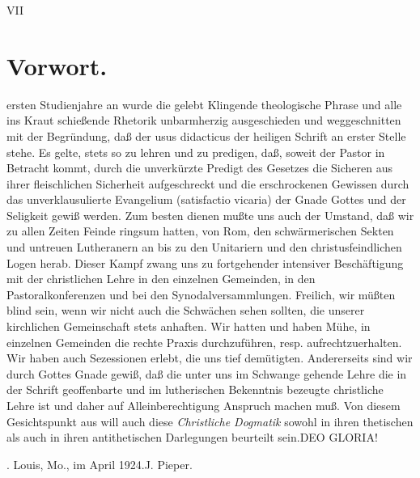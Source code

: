 \hfill VII\n\n\section*{Vorwort.}\nIm ersten Studienjahre an wurde die gelebt Klingende theologische Phrase und alle ins Kraut schießende Rhetorik unbarmherzig ausgeschieden und weggeschnitten mit der Begründung, daß der usus didacticus der heiligen Schrift an erster Stelle stehe. Es gelte, stets so zu lehren und zu predigen, daß, soweit der Pastor in Betracht kommt, durch die unverkürzte Predigt des Gesetzes die Sicheren aus ihrer fleischlichen Sicherheit aufgeschreckt und die erschrockenen Gewissen durch das unverklausulierte Evangelium (satisfactio vicaria) der Gnade Gottes und der Seligkeit gewiß werden. Zum besten dienen mußte uns auch der Umstand, daß wir zu allen Zeiten Feinde ringsum hatten, von Rom, den schwärmerischen Sekten und untreuen Lutheranern an bis zu den Unitariern und den christusfeindlichen Logen herab. Dieser Kampf zwang uns zu fortgehender intensiver Beschäftigung mit der christlichen Lehre in den einzelnen Gemeinden, in den Pastoralkonferenzen und bei den Synodalversammlungen. Freilich, wir müßten blind sein, wenn wir nicht auch die Schwächen sehen sollten, die unserer kirchlichen Gemeinschaft stets anhaften. Wir hatten und haben Mühe, in einzelnen Gemeinden die rechte Praxis durchzuführen, resp. aufrechtzuerhalten. Wir haben auch Sezessionen erlebt, die uns tief demütigten. Andererseits sind wir durch Gottes Gnade gewiß, daß die unter uns im Schwange gehende Lehre die in der Schrift geoffenbarte und im lutherischen Bekenntnis bezeugte christliche Lehre ist und daher auf Alleinberechtigung Anspruch machen muß. Von diesem Gesichtspunkt aus will auch diese \emph{Christliche Dogmatik} sowohl in ihren thetischen als auch in ihren antithetischen Darlegungen beurteilt sein.\n\n\vspace{1em}\n\centering\nSOLI DEO GLORIA!\n\par\n\n\vspace{1em}\nSt. Louis, Mo., im April 1924.\n\hfill J. Pieper.